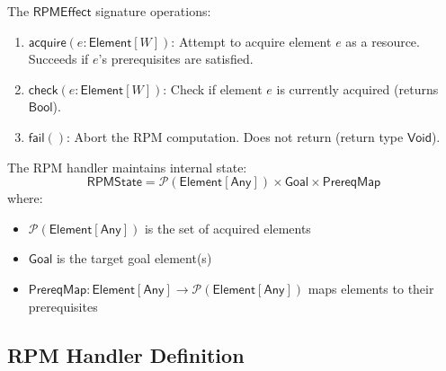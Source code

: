 \begin{definition}
\label{def:rpm-ops-detailed}
The $\mathsf{RPMEffect}$ signature operations:
\begin{enumerate}
  \item $\mathsf{acquire}(e : \mathsf{Element}[W])$: Attempt to acquire element $e$ as a resource. Succeeds if $e$'s prerequisites are satisfied.

  \item $\mathsf{check}(e : \mathsf{Element}[W])$: Check if element $e$ is currently acquired (returns $\mathsf{Bool}$).

  \item $\mathsf{fail}()$: Abort the RPM computation. Does not return (return type $\mathsf{Void}$).
\end{enumerate}
\end{definition}

\begin{definition}
\label{def:rpm-state}
The RPM handler maintains internal state:
\[
\mathsf{RPMState} = \mathcal{P}(\mathsf{Element}[\mathsf{Any}]) \times \mathsf{Goal} \times \mathsf{PrereqMap}
\]
where:
\begin{itemize}
  \item $\mathcal{P}(\mathsf{Element}[\mathsf{Any}])$ is the set of acquired elements
  \item $\mathsf{Goal}$ is the target goal element(s)
  \item $\mathsf{PrereqMap} : \mathsf{Element}[\mathsf{Any}] \to \mathcal{P}(\mathsf{Element}[\mathsf{Any}])$ maps elements to their prerequisites
\end{itemize}
\end{definition}

\subsection{RPM Handler Definition}
\label{subsec:rpm-handler-def}

